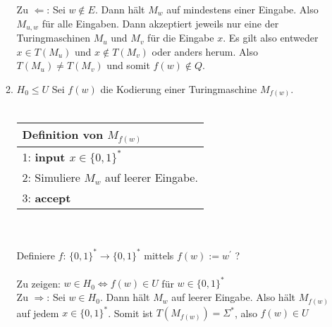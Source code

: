 \documentclass[12pt]{scrartcl}
\begin{document}
\begin{enumerate}
\begin{enumerate}
               Zu $\Leftarrow$: Sei $w \notin E$. Dann hält $M_w$ auf mindestens einer Eingabe. Also
               $M_{u,w}$ für alle Eingaben. Dann akzeptiert jeweils nur eine der Turingmaschinen $M_u$ und 
               $M_v$ für die Eingabe $x$. Es gilt also entweder $x \in T(M_u)$ und $x \notin T(M_v)$ oder anders herum.
               Also $T(M_u) \neq T(M_v)$ und somit $f(w) \notin Q$.
        \item $H_0 \leq U$
              Sei $f(w)$ die Kodierung einer Turingmaschine $M_{f(w)}$.\\\\
              \begin{tabular}[h!]{l}
                \hline
                Definition von $M_{f(w)}$\\\hline
                1: \textbf{input $x \in \{0,1\}^*$}\\
                2: Simuliere $M_{w}$ auf leerer Eingabe.\\
                3: \textbf{accept}\\\hline
              \end{tabular}\\\\
              Definiere $f: \, \{0,1\}^* \rightarrow \{0,1\}^*$ mittels $f(w) := w^{'}$ ?\\\\
              Zu zeigen: $w \in H_0 \Longleftrightarrow f(w) \in U $ für $w \in \{0,1\}^*$\\
              Zu $\Rightarrow$: Sei $w \in H_0$. Dann hält $M_{w}$ auf leerer Eingabe. Also hält $M_{f(w)}$ auf jedem $x \in \{0,1\}^*$.
              Somit ist $T(M_{f(w)}) = \Sigma^*$, also $f(w) \in U$\\


\end{enumerate}
\end{enumerate}
\end{document}
